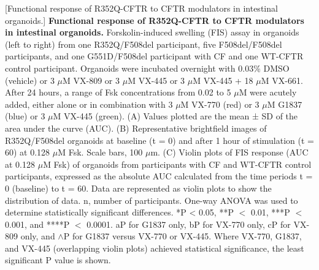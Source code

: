 [Functional response of R352Q-CFTR to CFTR modulators in intestinal organoids.] {\textbf{Functional response of R352Q-CFTR to CFTR modulators in intestinal organoids.}}{ Forskolin-induced swelling (FIS) assay in organoids (left to right) from one R352Q/F508del participant, five F508del/F508del participants, and one G551D/F508del participant with CF and one WT-CFTR control participant. Organoids were incubated overnight with 0.03\% DMSO (vehicle) or 3 $\mu$M VX-809 or 3 $\mu$M VX-445 or 3 $\mu$M VX-445 + 18 $\mu$M VX-661. After 24 hours, a range of Fsk concentrations from 0.02 to 5 $\mu$M were acutely added, either alone or in combination with 3 $\mu$M VX-770 (red) or 3 $\mu$M G1837 (blue) or 3 $\mu$M VX-445 (green). (A) Values plotted are the mean ± SD of the area under the curve (AUC). (B) Representative brightfield images of R352Q/F508del organoids at baseline (t = 0) and after 1 hour of stimulation (t = 60) at 0.128 $\mu$M Fsk. Scale bars, 100 $\mu$m. (C) Violin plots of FIS response (AUC at 0.128 $\mu$M Fsk) of organoids from participants with CF and WT-CFTR control participants, expressed as the absolute AUC calculated from the time periods t = 0 (baseline) to t = 60. Data are represented as violin plots to show the distribution of data. n, number of participants. One-way ANOVA was used to determine statistically significant differences. *P < 0.05, **P $<$ 0.01, ***P $<$ 0.001, and ****P $<$ 0.0001. aP for G1837 only, bP for VX-770 only, cP for VX-809 only, and $\wedge$P for G1837 versus VX-770 or VX-445. Where VX-770, G1837, and VX-445 (overlapping violin plots) achieved statistical significance, the least significant P value is shown.}
\label{R352Q_figure_2}
\endgroup

